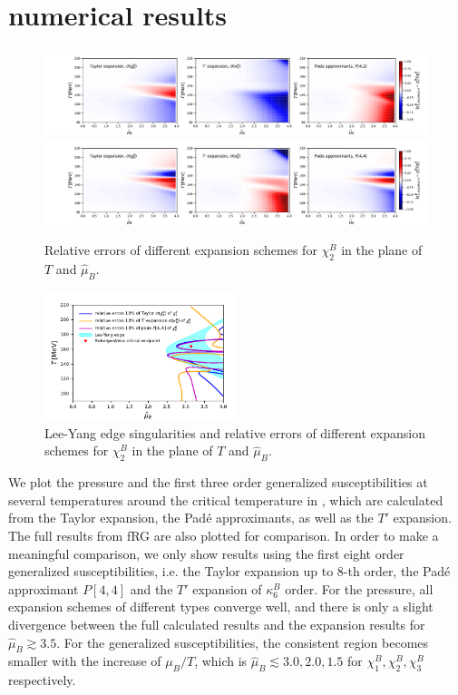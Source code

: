 \documentclass[%
reprint,
superscriptaddress,
preprintnumbers,
amsmath,amssymb,
aps,
prd,
]{revtex4-2}
\def\Fig#1{\Cref{#1}}
\begin{document}
\section{numerical results}
\label{sec:res}

%
\begin{figure}[t]
\includegraphics[width=1\textwidth]{diffchi2_3A}
\includegraphics[width=1\textwidth]{diffchi2_3}
\caption{Relative errors of different expansion schemes for $\chi_2^B$ in the plane of $T$ and $\hat \mu_B$.}\label{fig:heatchi}
\end{figure}
%

%
\begin{figure}[t]
\includegraphics[width=0.5\textwidth]{Rconv}
\caption{Lee-Yang edge singularities and relative errors of different expansion schemes for $\chi_2^B$ in the plane of $T$ and $\hat \mu_B$.}\label{fig:Rconv}
\end{figure}
%

We plot the pressure and the first three order generalized susceptibilities at several temperatures around the critical temperature in \Fig{fig:pre_sus}, which are calculated from the Taylor expansion, the Pad\'e approximants, as well as the $T'$ expansion. The full results from fRG are also plotted for comparison. In order to make a meaningful comparison, we only show results using the first eight order generalized susceptibilities, i.e. the Taylor expansion up to 8-th order, the Pad\'e approximant $P[4,4]$ and the $T'$ expansion of $\kappa^B_6$ order. For the pressure, all expansion schemes of different types converge well, and there is only a slight divergence between the full calculated results and the expansion results for $\hat \mu_B\gtrsim 3.5$. For the generalized susceptibilities, the consistent region becomes smaller with the increase of $\mu_B/T$, which is  $\hat \mu_B\lesssim 3.0, 2.0, 1.5$ for $\chi_1^B,\chi_2^B,\chi_3^B$ respectively.
\end{document}
